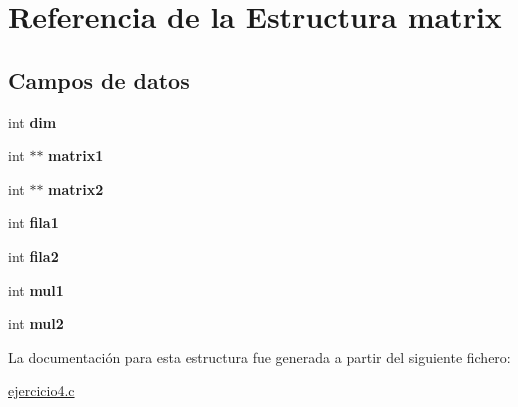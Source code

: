 \hypertarget{structmatrix}{}\section{Referencia de la Estructura matrix}
\label{structmatrix}
\subsection*{Campos de datos}
\begin{DoxyCompactItemize}
\item 
int {\bfseries dim}\hypertarget{structmatrix_ac555d1f0296d300abae35fd64afe0b87}{}\label{structmatrix_ac555d1f0296d300abae35fd64afe0b87}

\item 
int $\ast$$\ast$ {\bfseries matrix1}\hypertarget{structmatrix_ac24f129df509efe1cd0b54d707fa8071}{}\label{structmatrix_ac24f129df509efe1cd0b54d707fa8071}

\item 
int $\ast$$\ast$ {\bfseries matrix2}\hypertarget{structmatrix_add8a2cdae83ae685f5d120dd52561e6a}{}\label{structmatrix_add8a2cdae83ae685f5d120dd52561e6a}

\item 
int {\bfseries fila1}\hypertarget{structmatrix_a953218c79ce6af792c8f48bda1d490ca}{}\label{structmatrix_a953218c79ce6af792c8f48bda1d490ca}

\item 
int {\bfseries fila2}\hypertarget{structmatrix_abcf3d9279ba1858992b65bcf39f6646a}{}\label{structmatrix_abcf3d9279ba1858992b65bcf39f6646a}

\item 
int {\bfseries mul1}\hypertarget{structmatrix_a650aeaf369809556dcd40e458a02bccd}{}\label{structmatrix_a650aeaf369809556dcd40e458a02bccd}

\item 
int {\bfseries mul2}\hypertarget{structmatrix_a602974f58f94fda7067ada66e2cf56b2}{}\label{structmatrix_a602974f58f94fda7067ada66e2cf56b2}

\end{DoxyCompactItemize}


La documentación para esta estructura fue generada a partir del siguiente fichero\+:\begin{DoxyCompactItemize}
\item 
\hyperlink{ejercicio4_8c}{ejercicio4.\+c}\end{DoxyCompactItemize}
